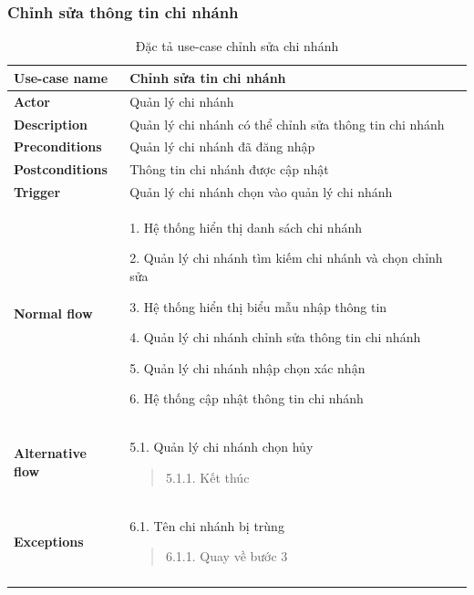 \subsubsection{Chỉnh sửa thông tin chi nhánh}
{
    \setlength\extrarowheight{6pt}
    \begin{longtable}{| p{} | p{} |}
        \hline
        \textbf{Use-case name}
         &
        Chỉnh sửa tin chi nhánh
        \\
        \hline
        \textbf{Actor}
         &
        Quản lý chi nhánh
        \\
        \hline
        \textbf{Description}
         &
        Quản lý chi nhánh có thể chỉnh sửa thông tin chi nhánh
        \\
        \hline
        \textbf{Preconditions}
         &
        Quản lý chi nhánh đã đăng nhập
        \\
        \hline
        \textbf{Postconditions}
         &
        Thông tin chi nhánh được cập nhật
        \\
        \hline
        \textbf{Trigger}
         &
        Quản lý chi nhánh chọn vào quản lý chi nhánh
        \\
        \hline
        \begin{flushleft}
            \textbf{Normal flow}
        \end{flushleft}
         &
        1. Hệ thống hiển thị danh sách chi nhánh

        2. Quản lý chi nhánh tìm kiếm chi nhánh và chọn chỉnh sửa

        3. Hệ thống hiển thị biểu mẫu nhập thông tin

        4. Quản lý chi nhánh chỉnh sửa thông tin chi nhánh

        5. Quản lý chi nhánh nhập chọn xác nhận

        6. Hệ thống cập nhật thông tin  chi nhánh
        \\
        \hline
        \begin{flushleft}
            \textbf{Alternative flow}
        \end{flushleft}
         &
        5.1. Quản lý chi nhánh chọn hủy
        \begin{quote}
            5.1.1. Kết thúc
        \end{quote}
        \\
        \hline
        \begin{flushleft}
            \textbf{Exceptions}
        \end{flushleft}
         &
        6.1. Tên chi nhánh bị trùng
        \begin{quote}
            6.1.1. Quay về bước 3
        \end{quote}
        \\
        \hline
        \caption{Đặc tả use-case chỉnh sửa chi nhánh}
    \end{longtable}
}


